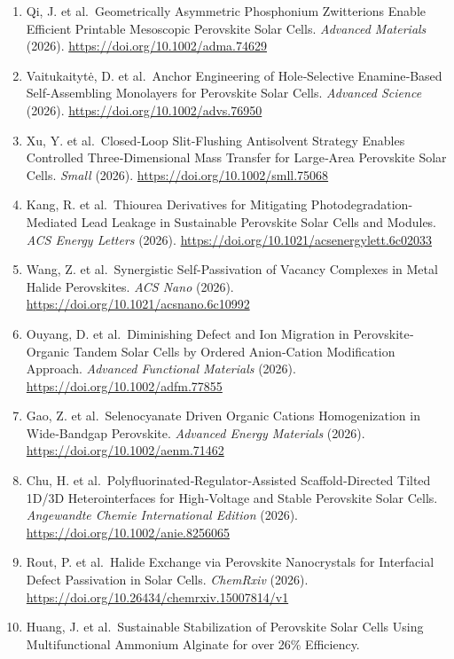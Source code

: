 \documentclass[
  11pt,
]{article}
\begin{document}
\begin{enumerate}
  Solar Module Fabrication. \emph{Advanced Materials} (2026).
  \url{https://doi.org/10.1002/adma.74469}
\item
  Qi, J. et al.~Geometrically Asymmetric Phosphonium Zwitterions Enable
  Efficient Printable Mesoscopic Perovskite Solar Cells. \emph{Advanced
  Materials} (2026). \url{https://doi.org/10.1002/adma.74629}
\item
  Vaitukaitytė, D. et al.~Anchor Engineering of Hole‐Selective
  Enamine‐Based Self‐Assembling Monolayers for Perovskite Solar Cells.
  \emph{Advanced Science} (2026).
  \url{https://doi.org/10.1002/advs.76950}
\item
  Xu, Y. et al.~Closed‐Loop Slit‐Flushing Antisolvent Strategy Enables
  Controlled Three‐Dimensional Mass Transfer for Large‐Area Perovskite
  Solar Cells. \emph{Small} (2026).
  \url{https://doi.org/10.1002/smll.75068}
\item
  Kang, R. et al.~Thiourea Derivatives for Mitigating
  Photodegradation-Mediated Lead Leakage in Sustainable Perovskite Solar
  Cells and Modules. \emph{ACS Energy Letters} (2026).
  \url{https://doi.org/10.1021/acsenergylett.6c02033}
\item
  Wang, Z. et al.~Synergistic Self-Passivation of Vacancy Complexes in
  Metal Halide Perovskites. \emph{ACS Nano} (2026).
  \url{https://doi.org/10.1021/acsnano.6c10992}
\item
  Ouyang, D. et al.~Diminishing Defect and Ion Migration in
  Perovskite‐Organic Tandem Solar Cells by Ordered Anion‐Cation
  Modification Approach. \emph{Advanced Functional Materials} (2026).
  \url{https://doi.org/10.1002/adfm.77855}
\item
  Gao, Z. et al.~Selenocyanate Driven Organic Cations Homogenization in
  Wide‐Bandgap Perovskite. \emph{Advanced Energy Materials} (2026).
  \url{https://doi.org/10.1002/aenm.71462}
\item
  Chu, H. et al.~Polyfluorinated‐Regulator‐Assisted Scaffold‐Directed
  Tilted 1D/3D Heterointerfaces for High‐Voltage and Stable Perovskite
  Solar Cells. \emph{Angewandte Chemie International Edition} (2026).
  \url{https://doi.org/10.1002/anie.8256065}
\item
  Rout, P. et al.~Halide Exchange via Perovskite Nanocrystals for
  Interfacial Defect Passivation in Solar Cells. \emph{ChemRxiv} (2026).
  \url{https://doi.org/10.26434/chemrxiv.15007814/v1}
\item
  Huang, J. et al.~Sustainable Stabilization of Perovskite Solar Cells
  Using Multifunctional Ammonium Alginate for over 26\% Efficiency.

\end{enumerate}
\end{document}
